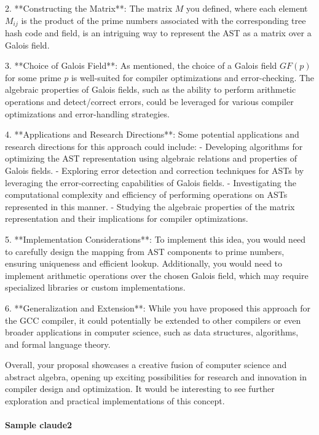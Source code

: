 \documentclass{article}
\begin{document}
2. **Constructing the Matrix**: The matrix $M$ you defined, where each element $M_{ij}$ is the product of the prime numbers associated with the corresponding tree hash code and field, is an intriguing way to represent the AST as a matrix over a Galois field.

3. **Choice of Galois Field**: As mentioned, the choice of a Galois field $GF(p)$ for some prime $p$ is well-suited for compiler optimizations and error-checking. The algebraic properties of Galois fields, such as the ability to perform arithmetic operations and detect/correct errors, could be leveraged for various compiler optimizations and error-handling strategies.

4. **Applications and Research Directions**: Some potential applications and research directions for this approach could include:
   - Developing algorithms for optimizing the AST representation using algebraic relations and properties of Galois fields.
   - Exploring error detection and correction techniques for ASTs by leveraging the error-correcting capabilities of Galois fields.
   - Investigating the computational complexity and efficiency of performing operations on ASTs represented in this manner.
   - Studying the algebraic properties of the matrix representation and their implications for compiler optimizations.

5. **Implementation Considerations**: To implement this idea, you would need to carefully design the mapping from AST components to prime numbers, ensuring uniqueness and efficient lookup. Additionally, you would need to implement arithmetic operations over the chosen Galois field, which may require specialized libraries or custom implementations.

6. **Generalization and Extension**: While you have proposed this approach for the GCC compiler, it could potentially be extended to other compilers or even broader applications in computer science, such as data structures, algorithms, and formal language theory.

Overall, your proposal showcases a creative fusion of computer science and abstract algebra, opening up exciting possibilities for research and innovation in compiler design and optimization. It would be interesting to see further exploration and practical implementations of this concept.

\paragraph{Sample claude2}
\end{document}
